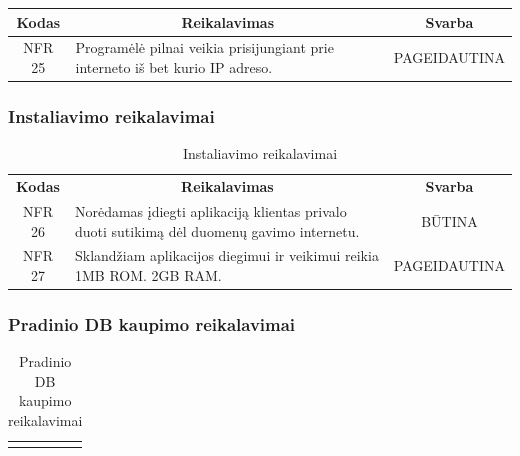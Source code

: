 \documentclass{VUMIFPSkursinis}
\begin{document}
{{{{{\begin{center}
\begin{table}[H]
\begin{tabular}{|p{2cm}|p{}|p{}|}
	\hline
		\multicolumn{1}{|c|}{{\bfseries Kodas}}&
		\multicolumn{1}{|c|}{{\bfseries Reikalavimas}}&
		\multicolumn{1}{|c|}{{\bfseries Svarba}}\\
	\hline 	
		\multicolumn{1}{|c|}{NFR 25}&
		{Programėlė pilnai veikia prisijungiant prie interneto iš bet kurio IP adreso.}&
		\multicolumn{1}{|p{1.5cm}|}{PAGEIDAUTINA}\\	
	
	\hline
	
	
	\end{tabular}
	
	\label{table:Ruošinioreikalavimai}
	\end{table}

\end{center}

\subsubsection{Instaliavimo reikalavimai }
\begin{center}
	\begin{table}[H]
	\caption{Instaliavimo reikalavimai}
	\begin{tabular}{|p{2cm}|p{}|p{}|}
	\hline
	    \rowcolor{lightgray}
		\multicolumn{3}{|c|}{Instaliavimo reikalavimai}\\
		
	\hline
		\multicolumn{1}{|c|}{{\bfseries Kodas}}&
		\multicolumn{1}{|c|}{{\bfseries Reikalavimas}}&
		\multicolumn{1}{|c|}{{\bfseries Svarba}}\\
	\hline 	
		\multicolumn{1}{|c|}{NFR 26}&
		{Norėdamas įdiegti aplikaciją klientas privalo duoti sutikimą dėl duomenų gavimo internetu.}&
		\multicolumn{1}{|c|}{BŪTINA}\\	
	
	\hline 	
		\multicolumn{1}{|c|}{NFR 27}&
		{Sklandžiam aplikacijos diegimui ir veikimui reikia 1MB ROM. 2GB RAM.}&
		\multicolumn{1}{|p{1.5cm}|}{PAGEIDAUTINA}\\	
	
	\hline
	
	
	\end{tabular}
	
	\label{table:Instaliavimoreikalavimai}
	\end{table}

\end{center}

\subsubsection{Pradinio DB kaupimo reikalavimai}
\begin{center}
	\begin{table}[H]
	\caption{Pradinio DB kaupimo reikalavimai}
	\begin{tabular}{|p{2cm}|p{}|p{}|}
	\hline
	    \rowcolor{lightgray}
		\multicolumn{3}{|c|}{Pradinio DB kaupimo reikalavimai}\\
		

\end{tabular}
\end{table}
\end{center}}}}}}
\end{document}
